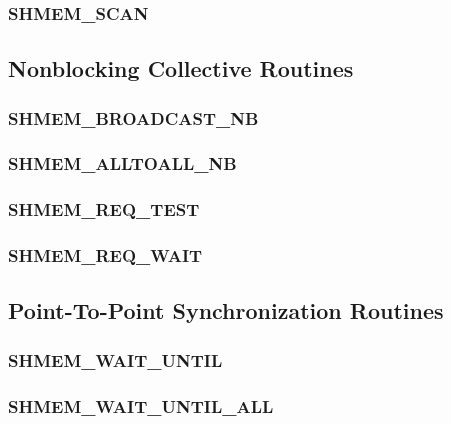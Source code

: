 \documentclass[10pt,oneside]{book}
\begin{document}
\subsubsection{\textbf{SHMEM\_SCAN}}\label{subsec:shmem_scan}


\newpage 
\subsection{Nonblocking Collective Routines}\label{subsec:nb_coll}


\subsubsection{\textbf{SHMEM\_BROADCAST\_NB}}\label{subsec:shmem_broadcast_nb}


\subsubsection{\textbf{SHMEM\_ALLTOALL\_NB}}\label{subsec:shmem_alltoall_nb}


\subsubsection{\textbf{SHMEM\_REQ\_TEST}}\label{subsec:shmem_collective_test}


\subsubsection{\textbf{SHMEM\_REQ\_WAIT}}\label{subsec:shmem_collective_wait}


\subsection{Point-To-Point Synchronization Routines}\label{subsec:p2p_intro}


\subsubsection{\textbf{SHMEM\_WAIT\_UNTIL}}\label{subsec:shmem_wait_until}


\subsubsection{\textbf{SHMEM\_WAIT\_UNTIL\_ALL}}\label{subsec:shmem_wait_until_all}

\end{document}
